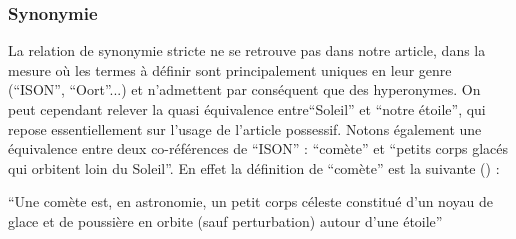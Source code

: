 \documentclass[a4paper,10pt]{article}
\begin{document}
		\subsubsection{Synonymie}
			La relation de synonymie stricte ne se retrouve pas dans notre article, dans la mesure où les termes à définir sont principalement uniques en leur genre (``ISON'', ``Oort''...) et n'admettent par conséquent que des hyperonymes. On peut cependant relever la quasi équivalence entre``Soleil'' et ``notre étoile'', qui repose essentiellement sur l'usage de l'article possessif. Notons également une équivalence entre deux co-références de ``ISON'' : ``comète'' et ``petits corps glacés qui orbitent loin du Soleil''. En effet la définition de ``comète'' est la suivante (\cite{comete}) :
			\begin{center}
				\footnotesize
				\begin{minipage}{0.7\textwidth}
					``Une comète est, en astronomie, un petit corps céleste constitué d'un noyau de glace et de poussière en orbite (sauf perturbation) autour d'une étoile''
				\end{minipage}
			\end{center}
\end{document}
